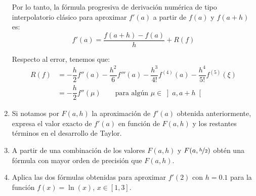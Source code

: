 \begin{ejercicio}
\begin{enumerate}
        Por lo tanto, la fórmula progresiva de derivación numérica de tipo interpolatorio clásico para aproximar $f'(a)$ a partir de $f(a)$ y $f(a + h)$ es:
        \begin{equation*}
            f'(a) = \dfrac{f(a + h) - f(a)}{h} + R(f)
        \end{equation*}

        Respecto al error, tenemos que:
        \begin{align*}
            R(f) &= -\dfrac{h}{2}f''(a) -\dfrac{h^2}{6}f'''(a) -\dfrac{h^3}{4!}f^{(4)}(a) - \dfrac{h^4}{5!}f^{(5)}(\xi) \\
            &= -\dfrac{h}{2}f''(\mu)\qquad \text{para algún }\mu\in\left]a,a+h\right[
        \end{align*}



        
        \item Si notamos por $F(a, h)$ la aproximación de $f'(a)$ obtenida anteriormente, expresa el valor exacto de $f'(a)$ en función de $F(a, h)$ y los restantes términos en el desarrollo de Taylor.
        
        \item A partir de una combinación de los valores $F(a, h)$ y $F(a, \nicefrac{h}{2})$ obtén una fórmula con mayor orden de precisión que $F(a, h)$.
        
        \item Aplica las dos fórmulas obtenidas para aproximar $f'(2)$ con $h = 0.1$ para la función $f(x) = \ln(x)$, $x \in [1, 3]$.
    \end{enumerate}
\end{ejercicio}

